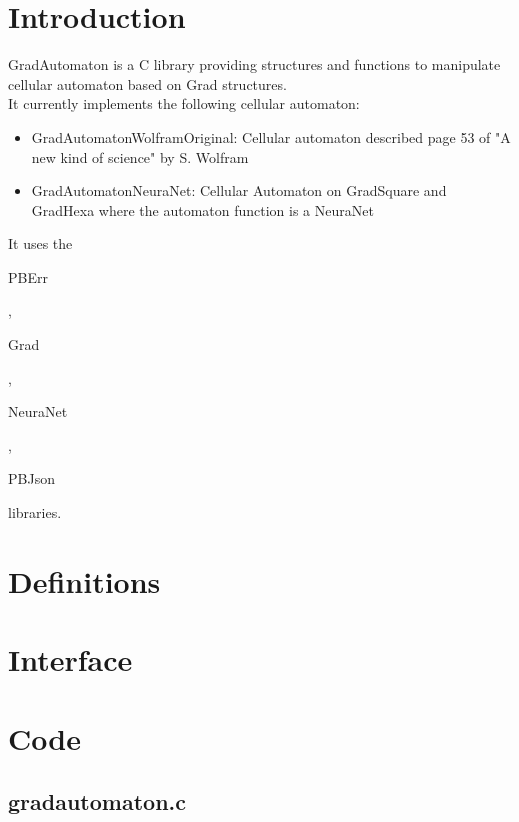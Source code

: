 \section*{Introduction}

GradAutomaton is a C library providing structures and functions to manipulate cellular automaton based on Grad structures.\\

It currently implements the following cellular automaton:\\
\begin{itemize}
\item GradAutomatonWolframOriginal: Cellular automaton described page 53 of "A new kind of science" by S. Wolfram
\item GradAutomatonNeuraNet: Cellular Automaton on GradSquare and GradHexa where the automaton function is a NeuraNet
\end{itemize}

It uses the \begin{ttfamily}PBErr\end{ttfamily}, \begin{ttfamily}Grad\end{ttfamily}, \begin{ttfamily}NeuraNet\end{ttfamily}, \begin{ttfamily}PBJson\end{ttfamily} libraries.\\

\section{Definitions}


\section{Interface}

\begin{scriptsize}
\begin{ttfamily}

\end{ttfamily}
\end{scriptsize}

\section{Code}

\subsection{gradautomaton.c}

